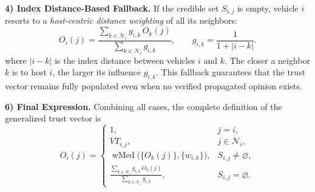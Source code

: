 \documentclass{ifacconf}
\begin{document}
\vspace{1ex}
\noindent\textbf{4) Index Distance-Based Fallback.}
If the credible set $S_{i,j}$ is empty, 
vehicle $i$ resorts to a \emph{host-centric distance weighting} of all its neighbors:
\begin{equation}
O_i(j) =
\frac{\sum_{k\in\mathcal{N}_i} g_{i,k} \, O_k(j)}{\sum_{k\in\mathcal{N}_i} g_{i,k}},
\qquad
g_{i,k} = 
\frac{1}
{1 + |i - k|} .
\label{eq:distance}
\end{equation}
where $|i - k|$ is the index distance between vehicles $i$ and $k$.
The closer a neighbor $k$ is to host $i$, the larger its influence $g_{i,k}$.
This fallback guarantees that the trust vector remains fully populated even when 
no verified propagated opinion exists.


\vspace{1ex}
\noindent\textbf{6) Final Expression.}
Combining all cases, the complete definition of the generalized trust vector is
\begin{equation}
O_i(j) =
\begin{cases}
1, & j = i,\\[1ex]
VT_{i,j}, & j \in \mathcal{N}_i,\\[1ex]
\operatorname{wMed}\bigl(\{O_k(j)\}, \{w_{i,k}\}\bigr),
& S_{i,j} \neq \varnothing,\\[1ex]
\displaystyle
\frac{\sum_{k\in\mathcal{N}_i} g_{i,k} \, O_k(j)}{\sum_{k\in\mathcal{N}_i} g_{i,k}},
& S_{i,j} = \varnothing.
\end{cases}
\label{eq:final_trust_vector}
\end{equation}
\end{document}
